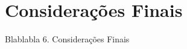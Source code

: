 \documentclass[11.5pt]{article}
\begin{document}
\section{Considerações Finais}
Blablabla
6. Considerações Finais







\clearpage
\end{document}
